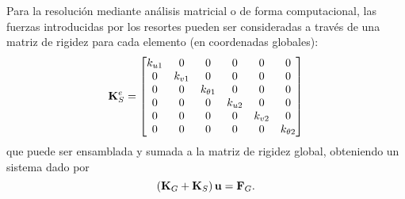 Para la resolución mediante análisis matricial o  de forma computacional, las fuerzas introducidas por los resortes pueden ser consideradas a través de una matriz de rigidez para cada elemento (en coordenadas globales):
\begin{equation}
	{\bf K}_S^e = 
	\left[
	\begin{matrix}
		k_{u1} & 0 & 0 & 0 &  0 & 0 \\
		0 & k_{v1} & 0 & 0 &  0 & 0\\
		0 & 0 &k_{\theta1} & 0 &  0 & 0\\
		0 & 0 &0  &   k_{u2} & 0& 0\\
		0 & 0 &0  &  0 & k_{v2} & 0\\
		0 & 0 &0 & 0 &  0 & k_{\theta2}\\
	\end{matrix}
	\right]
\end{equation}
que puede ser ensamblada y sumada a la matriz de rigidez global, obteniendo un sistema dado por
%
\begin{equation}
	\left({\bf K}_G + {\bf K}_S \right) {\bf u} = {\bf F}_G.
\end{equation}




%

